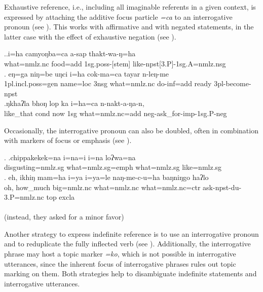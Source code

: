 Exhaustive reference, i.e., including all imaginable referents in a given context, is expressed by attaching the additive focus particle \emph{=ca} to an interrogative pronoun (see \Next). This works with affirmative and with negated statements, in the latter case with the effect of exhaustive negation (see \Next[c]).

\ex.\ag.i=ha camyoŋba=ca a-sap thakt-wa-ŋ=ha\\
what{\sc =nmlz.nc} food{\sc =add} {\sc 1sg.poss-[stem]} like{\sc-npst[3.P]-1sg.A=nmlz.nsg}\\
\bg. eŋ=ga              niŋ=be    uŋci i=ha            cok-ma=ca            tayar  n-leŋ-me\\
{\sc 1pl.incl.poss=gen} name{\sc =loc} {\sc 3nsg} what{\sc =nmlz.nc} do{\sc -inf=add} ready {\sc 3pl-}become{\sc -npst}\\
 
\bg.ŋkhaʔla bhoŋ     lop ka  i=ha=ca                       n-nakt-a-ŋa-n,\\
like\_that {\sc cond} now {\sc 1sg} what{\sc =nmlz.nc=add} {\sc neg-}ask\_for{\sc -imp-1sg.P-neg}\\
  

Occasionally, the interrogative pronoun can also be doubled, often in combination with markers of focus or emphasis (see \Next).

\ex. \ag.chippakekek=na         i=na=i                i=na           loʔwa=na\\
disgusting{\sc =nmlz.sg} what{\sc =nmlz.sg=emph} what{\sc =nmlz.sg} like{\sc =nmlz.sg}\\
 
\bg. eh,    ikhiŋ   mam=ha i=ya i=ya=le                         naŋ-me-c-u=ha baŋniŋgo     haʔlo\\
 oh, how\_much big{\sc =nmlz.nc} what{\sc =nmlz.nc} what{\sc =nmlz.nc=ctr} ask{\sc -npst-du-3.P=nmlz.nc} {\sc top} {\sc excla}\\
 \\
 (instead, they asked for a minor favor) 
 
 
Another strategy to express indefinite reference is to use an interrogative pronoun and to reduplicate  the fully inflected verb (see \Next). Additionally, the interrogative phrase may host a topic marker \emph{=ko}, which is not possible in interrogative utterances, since the inherent focus of interrogative phrases rules out topic marking on them. Both strategies help to disambiguate indefinite statements and interrogative utterances.

